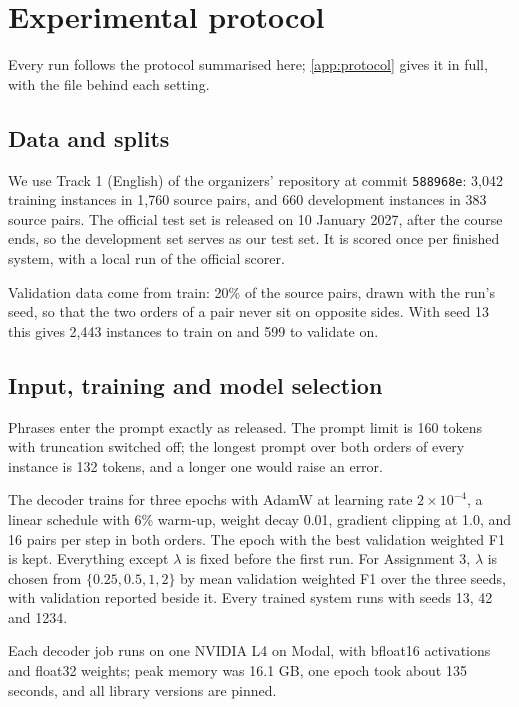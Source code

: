 \section{Experimental protocol}
\label{sec:protocol}

Every run follows the protocol summarised here; \cref{app:protocol} gives it in full, with the file behind each setting.

\subsection{Data and splits}

We use Track 1 (English) of the organizers' repository at commit \texttt{588968e}: 3,042 training instances in 1,760 source pairs, and 660 development instances in 383 source pairs. The official test set is released on 10 January 2027, after the course ends, so the development set serves as our test set. It is scored once per finished system, with a local run of the official scorer.

Validation data come from train: 20\% of the source pairs, drawn with the run's seed, so that the two orders of a pair never sit on opposite sides. With seed 13 this gives 2,443 instances to train on and 599 to validate on.

\subsection{Input, training and model selection}

Phrases enter the prompt exactly as released. The prompt limit is 160 tokens with truncation switched off; the longest prompt over both orders of every instance is 132 tokens, and a longer one would raise an error.

The decoder trains for three epochs with AdamW at learning rate $2 \times 10^{-4}$, a linear schedule with 6\% warm-up, weight decay 0.01, gradient clipping at 1.0, and 16 pairs per step in both orders. The epoch with the best validation weighted F1 is kept. Everything except $\lambda$ is fixed before the first run. For Assignment 3, $\lambda$ is chosen from $\{0.25, 0.5, 1, 2\}$ by mean validation weighted F1 over the three seeds, with validation \HardCons{} reported beside it. Every trained system runs with seeds 13, 42 and 1234.

Each decoder job runs on one NVIDIA L4 on Modal, with bfloat16 activations and float32 weights; peak memory was 16.1 GB, one epoch took about 135 seconds, and all library versions are pinned.

